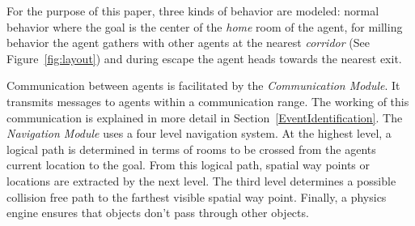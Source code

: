 

For the purpose of this paper, three kinds of behavior are modeled: normal behavior where the goal is the center of the \emph{home} room of the agent, for milling behavior the agent gathers with other agents at the nearest \emph{corridor} (See Figure~\ref{fig:layout}) and during escape the agent heads towards the nearest exit.

Communication between agents is facilitated by the {\em Communication Module}. It transmits messages to agents within a communication range. The working of this communication is explained in more detail in Section~\ref{EventIdentification}. The {\em Navigation Module} uses a four level navigation system. At the highest level, a logical path is determined in terms of rooms to be crossed from the agents current location to the goal. From this logical path, spatial way points or locations are extracted by the next level. The third level determines a possible collision free path to the farthest visible spatial way point. Finally, a physics engine ensures that objects don't pass through other objects.

